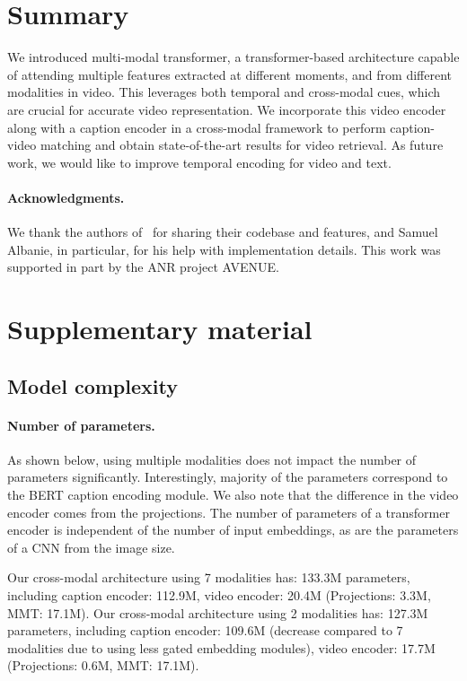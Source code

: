 \documentclass[runningheads]{llncs}
\begin{document}
\section{Summary}
We introduced multi-modal transformer, a transformer-based architecture capable of attending multiple features extracted at different moments, and from different modalities in video. This leverages both temporal and cross-modal cues, which are crucial for accurate video representation. We incorporate this video encoder along with a caption encoder in a cross-modal framework to perform caption-video matching and obtain state-of-the-art results for video retrieval. As future work, we would like to improve temporal encoding for video and text.



\paragraph{Acknowledgments.}
We thank the authors of~\cite{liu2019use} for sharing their codebase and features, and Samuel Albanie, in particular, for his help with implementation details. This work was supported in part by the ANR project AVENUE. 



\newpage
\appendix
\section{Supplementary material}

\subsection{Model complexity}

\paragraph{Number of parameters.} As shown below, using multiple modalities does not impact the number of parameters significantly. Interestingly, majority of the parameters correspond to the BERT caption encoding module. We also note that the difference in the video encoder comes from the projections. The number of parameters of a transformer encoder is independent of the number of input embeddings, as are the parameters of a CNN from the image size.

Our cross-modal architecture using 7 modalities has: 
133.3M parameters, including caption encoder: 112.9M, video encoder: 20.4M (Projections: 3.3M, MMT: 17.1M).
Our cross-modal architecture using 2 modalities has:
127.3M parameters, including caption encoder: 109.6M (decrease compared to 7 modalities due to using less gated embedding modules), video encoder: 17.7M (Projections: 0.6M, MMT: 17.1M).
\end{document}
